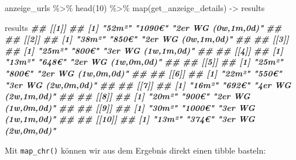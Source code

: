 \documentclass[
  ngerman,
]{article}
\newenvironment{Shaded}{\begin{snugshade}}{\end{snugshade}}
\newcommand{\DecValTok}[1]{\textcolor[rgb]{0.00,0.00,0.81}{#1}}
\newcommand{\DocumentationTok}[1]{\textcolor[rgb]{0.56,0.35,0.01}{\textbf{\textit{#1}}}}
\newcommand{\FunctionTok}[1]{\textcolor[rgb]{0.00,0.00,0.00}{#1}}
\newcommand{\NormalTok}[1]{#1}
\newcommand{\OtherTok}[1]{\textcolor[rgb]{0.56,0.35,0.01}{#1}}
\newcommand{\SpecialCharTok}[1]{\textcolor[rgb]{0.00,0.00,0.00}{#1}}
\begin{document}
\begin{Shaded}
\begin{Highlighting}[]
\NormalTok{anzeige\_urls }\SpecialCharTok{\%\textgreater{}\%}
  \FunctionTok{head}\NormalTok{(}\DecValTok{10}\NormalTok{) }\SpecialCharTok{\%\textgreater{}\%}
  \FunctionTok{map}\NormalTok{(get\_anzeige\_details) }\OtherTok{{-}\textgreater{}}\NormalTok{ results}
 
\NormalTok{results}
\DocumentationTok{\#\# [[1]]}
\DocumentationTok{\#\# [1] "52m²"              "1090€"             "2er WG (0w,1m,0d)"}
\DocumentationTok{\#\# }
\DocumentationTok{\#\# [[2]]}
\DocumentationTok{\#\# [1] "38m²"              "850€"              "2er WG (0w,1m,0d)"}
\DocumentationTok{\#\# }
\DocumentationTok{\#\# [[3]]}
\DocumentationTok{\#\# [1] "25m²"              "800€"              "3er WG (1w,1m,0d)"}
\DocumentationTok{\#\# }
\DocumentationTok{\#\# [[4]]}
\DocumentationTok{\#\# [1] "13m²"              "648€"              "2er WG (1w,0m,0d)"}
\DocumentationTok{\#\# }
\DocumentationTok{\#\# [[5]]}
\DocumentationTok{\#\# [1] "25m²"              "800€"              "2er WG (1w,0m,0d)"}
\DocumentationTok{\#\# }
\DocumentationTok{\#\# [[6]]}
\DocumentationTok{\#\# [1] "22m²"              "550€"              "3er WG (2w,0m,0d)"}
\DocumentationTok{\#\# }
\DocumentationTok{\#\# [[7]]}
\DocumentationTok{\#\# [1] "16m²"              "692€"              "4er WG (2w,1m,0d)"}
\DocumentationTok{\#\# }
\DocumentationTok{\#\# [[8]]}
\DocumentationTok{\#\# [1] "20m²"              "900€"              "2er WG (1w,0m,0d)"}
\DocumentationTok{\#\# }
\DocumentationTok{\#\# [[9]]}
\DocumentationTok{\#\# [1] "30m²"              "1000€"             "3er WG (1w,1m,0d)"}
\DocumentationTok{\#\# }
\DocumentationTok{\#\# [[10]]}
\DocumentationTok{\#\# [1] "13m²"              "374€"              "3er WG (2w,0m,0d)"}
\end{Highlighting}
\end{Shaded}

Mit \texttt{map\_chr()} können wir aus dem Ergebnis direkt einen tibble basteln:
\end{document}
